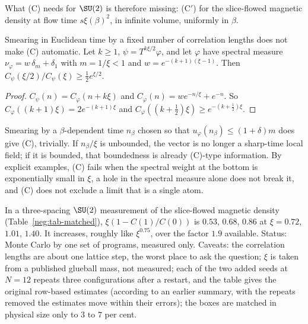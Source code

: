 What (C) needs for $\SU(2)$ is therefore missing: (C$'$) for the slice-flowed magnetic density at
flow time $s\xi(\beta)^2$, in infinite volume, uniformly in $\beta$.

\begin{proposition}\label{neg:prop-smear}
Smearing in Euclidean time by a fixed number of correlation lengths does not make (C)
automatic. Let $k\ge1$, $\psi=T^{k\xi/2}\varphi$, and let $\varphi$ have spectral measure
$\nu_\varphi=w\,\delta_m+\delta_1$ with $m=1/\xi<1$ and $w=e^{-(k+1)(\xi-1)}$. Then
$C_\psi(\xi/2)/C_\psi(\xi)\ge\frac12e^{\xi/2}$.
\end{proposition}

\begin{proof}
$C_\psi(n)=C_\varphi(n+k\xi)$ and $C_\varphi(n)=we^{-n/\xi}+e^{-n}$. So
$C_\varphi((k+1)\xi)=2e^{-(k+1)\xi}$ and $C_\varphi((k+\frac12)\xi)\ge e^{-(k+\frac12)\xi}$.
\end{proof}

Smearing by a $\beta$-dependent time $n_\beta$ chosen so that $u_\varphi(n_\beta)\le(1+\delta)m$
does give (C), trivially. If $n_\beta/\xi$ is unbounded, the vector is no longer a sharp-time
local field; if it is bounded, that boundedness is already (C)-type information. By explicit
examples, (C) fails when the spectral weight at the bottom is exponentially small in $\xi$, a
hole in the spectral measure alone does not break it, and (C) does not exclude a limit that is a
single atom.

\begin{observation}\label{neg:obs-matched}
In a three-spacing $\SU(2)$ measurement of the slice-flowed magnetic density
(Table~\ref{neg:tab-matched}), $\xi(1-C(1)/C(0))$ is $0.53$, $0.68$, $0.86$ at $\xi=0.72$, $1.01$,
$1.40$. It increases, roughly like $\xi^{0.75}$, over the factor $1.9$ available. Status: Monte
Carlo by one set of programs, measured only. Caveats: the correlation lengths are about one lattice
step, the worst place to ask the question; $\xi$ is taken from a published glueball mass, not
measured; each of the two added seeds at $N=12$ repeats three configurations after a restart,
and the table gives the original row-based estimates (according to an earlier summary, with the
repeats removed the estimates move within their errors); the boxes are matched in physical size only to $3$ to $7$ per cent.
\end{observation}


